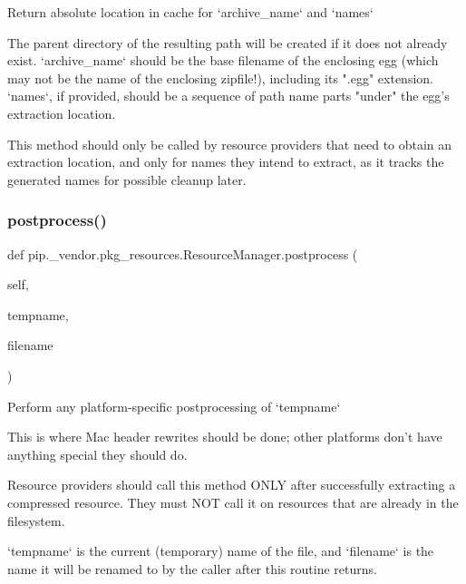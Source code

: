 \begin{DoxyVerb}Return absolute location in cache for `archive_name` and `names`

The parent directory of the resulting path will be created if it does
not already exist.  `archive_name` should be the base filename of the
enclosing egg (which may not be the name of the enclosing zipfile!),
including its ".egg" extension.  `names`, if provided, should be a
sequence of path name parts "under" the egg's extraction location.

This method should only be called by resource providers that need to
obtain an extraction location, and only for names they intend to
extract, as it tracks the generated names for possible cleanup later.
\end{DoxyVerb}
 \mbox{\label{classpip_1_1__vendor_1_1pkg__resources_1_1ResourceManager_a9e78cfa1ec4394b29ddd61e2e02fffb8}} 
\subsubsection{\texorpdfstring{postprocess()}{postprocess()}}
{\footnotesize\ttfamily def pip.\+\_\+vendor.\+pkg\+\_\+resources.\+Resource\+Manager.\+postprocess (\begin{DoxyParamCaption}\item[{}]{self,  }\item[{}]{tempname,  }\item[{}]{filename }\end{DoxyParamCaption})}

\begin{DoxyVerb}Perform any platform-specific postprocessing of `tempname`

This is where Mac header rewrites should be done; other platforms don't
have anything special they should do.

Resource providers should call this method ONLY after successfully
extracting a compressed resource.  They must NOT call it on resources
that are already in the filesystem.

`tempname` is the current (temporary) name of the file, and `filename`
is the name it will be renamed to by the caller after this routine
returns.
\end{DoxyVerb}
 \mbox{\label{classpip_1_1__vendor_1_1pkg__resources_1_1ResourceManager_a0edef70f261beddedfed3048c174d2d9}} 
